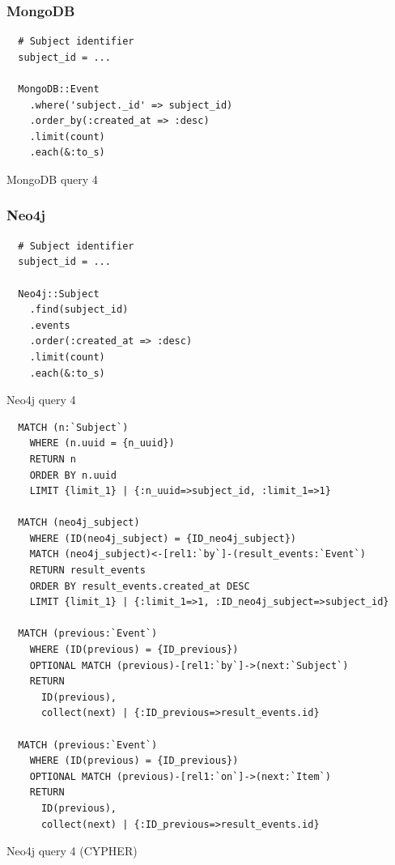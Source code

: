 \subsubsection*{MongoDB}

\begin{listing}[H]
  \begin{verbatim}
  # Subject identifier
  subject_id = ...

  MongoDB::Event
    .where('subject._id' => subject_id)
    .order_by(:created_at => :desc)
    .limit(count)
    .each(&:to_s)
  \end{verbatim}

  \caption{MongoDB query 4}
  \label{lst:mongodb-query-4}
\end{listing}

\subsubsection*{Neo4j}

\begin{listing}[H]
  \begin{verbatim}
  # Subject identifier
  subject_id = ...

  Neo4j::Subject
    .find(subject_id)
    .events
    .order(:created_at => :desc)
    .limit(count)
    .each(&:to_s)
  \end{verbatim}

  \caption{Neo4j query 4}
  \label{lst:neo4j-query-4}
\end{listing}

\begin{listing}[H]
  \begin{verbatim}
  MATCH (n:`Subject`)
    WHERE (n.uuid = {n_uuid})
    RETURN n
    ORDER BY n.uuid
    LIMIT {limit_1} | {:n_uuid=>subject_id, :limit_1=>1}

  MATCH (neo4j_subject)
    WHERE (ID(neo4j_subject) = {ID_neo4j_subject})
    MATCH (neo4j_subject)<-[rel1:`by`]-(result_events:`Event`)
    RETURN result_events
    ORDER BY result_events.created_at DESC
    LIMIT {limit_1} | {:limit_1=>1, :ID_neo4j_subject=>subject_id}

  MATCH (previous:`Event`)
    WHERE (ID(previous) = {ID_previous})
    OPTIONAL MATCH (previous)-[rel1:`by`]->(next:`Subject`)
    RETURN
      ID(previous),
      collect(next) | {:ID_previous=>result_events.id}

  MATCH (previous:`Event`)
    WHERE (ID(previous) = {ID_previous})
    OPTIONAL MATCH (previous)-[rel1:`on`]->(next:`Item`)
    RETURN
      ID(previous),
      collect(next) | {:ID_previous=>result_events.id}
  \end{verbatim}

  \caption{Neo4j query 4 (CYPHER)}
  \label{lst:neo4j-query-4-cypher}
\end{listing}

